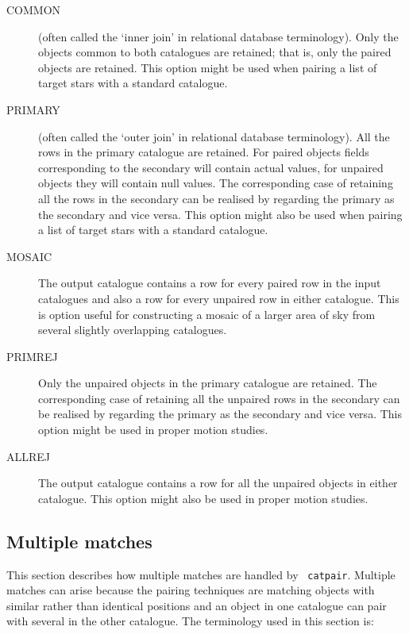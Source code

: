 \documentclass[twoside,11pt]{article}
\renewcommand{\_}{\texttt{\symbol{95}}}
\begin{document}
\begin{description}

  \item[COMMON] (often called the `inner join' in relational database
   terminology). Only the objects common to both catalogues are retained;
   that is, only the paired objects are retained. This option might be
   used when pairing a list of target stars with a standard catalogue.

  \item[PRIMARY] (often called the `outer join' in relational database
   terminology). All the rows in the primary catalogue are retained.
   For paired objects fields corresponding to the secondary will contain
   actual values, for unpaired objects they will contain null values.
   The corresponding case of retaining all the rows in the secondary
   can be realised by regarding the primary as the secondary and vice
   versa. This option might also be used when pairing a list of target 
   stars with a standard catalogue.

  \item[MOSAIC] The output catalogue contains a row for every paired row
   in the input catalogues and also a row for every unpaired row in
   either catalogue. This is option useful for constructing a mosaic of a
   larger area of sky from several slightly overlapping catalogues.

  \item[PRIMREJ] Only the unpaired objects in the primary catalogue are
   retained.    The corresponding case of retaining all the unpaired rows in 
   the secondary can be realised by regarding the primary as the secondary 
   and vice versa. This option might be used in proper motion studies.

  \item[ALLREJ] The output catalogue contains a row for all the unpaired
   objects in either catalogue. This option might also be used in proper 
   motion studies.

\end{description}


\subsection{\label{PAIR_MULTIPLE}Multiple matches}

This section describes how multiple matches are handled by {\tt
catpair}. Multiple matches can arise because the pairing techniques are 
matching objects with similar rather than identical positions and
an object in one catalogue can pair with several in the other catalogue. 
The terminology used in this section is:
\end{document}

